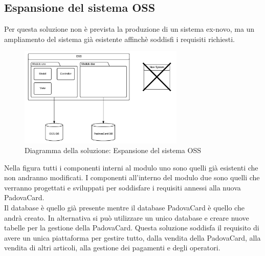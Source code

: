 \subsection{Espansione del sistema OSS}
Per questa soluzione non è prevista la produzione di un sistema ex-novo, ma un ampliamento del sistema  già esistente affinchè soddisfi i requisiti richiesti.
\begin{figure}[H]
\centering
\includegraphics[width=0.7\textwidth]{images/Espansione_del_sistema_OSS.png}
\caption{Diagramma della soluzione: Espansione del sistema OSS}
\end{figure}
Nella figura tutti i componenti interni al modulo uno sono quelli già esistenti che non andranno modificati.
I componenti all'interno del modulo due sono quelli che verranno progettati e sviluppati per soddisfare i requisiti annessi alla nuova PadovaCard.\\

Il database  è quello già presente mentre il database PadovaCard è quello che andrà creato. In alternativa si può utilizzare un unico database e creare nuove tabelle per la gestione della PadovaCard.
Questa soluzione soddisfa il requisito di avere un unica piattaforma per gestire tutto, dalla vendita della PadovaCard, alla vendita di altri articoli, alla gestione dei pagamenti e degli operatori.\\

